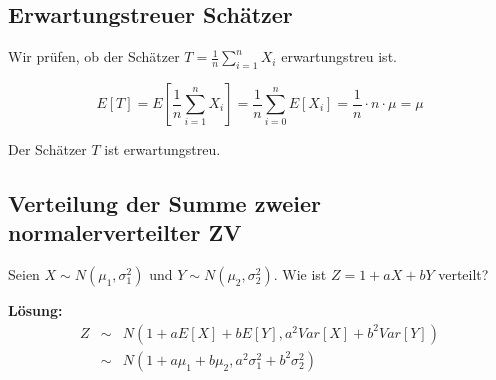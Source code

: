 \documentclass[10pt,a4paper,twocolumn]{article}
\begin{document}
\subsection{Erwartungstreuer Schätzer}
Wir prüfen, ob der Schätzer $T = \frac{1}{n}\sum\limits_{i=1}^{n}X_i$ erwartungstreu ist.

\[
E[T] = E\left[\frac{1}{n}\sum\limits_{i=1}^{n}X_i\right] = \frac{1}{n}\sum\limits_{i=0}^{n}E[X_i] = \frac{1}{n} \cdot n \cdot \mu = \mu
\]

Der Schätzer $T$ ist erwartungstreu.

\subsection{Verteilung der Summe zweier normalerverteilter ZV}
Seien $X\sim N(\mu_1,\sigma_1^2)$ und $Y\sim N(\mu_2,\sigma_2^2)$. Wie ist $Z=1+aX+bY$ verteilt?

\vspace{10pt}

\textbf{Lösung:} \\
\[
\begin{array}{rcl}
	Z & \sim & N(1+aE[X]+bE[Y],a^2Var[X]+b^2Var[Y]) \\
	& \sim & N(1+a\mu_1+b\mu_2,a^2\sigma_1^2+b^2\sigma_2^2) \\
\end{array}
\]
\end{document}
